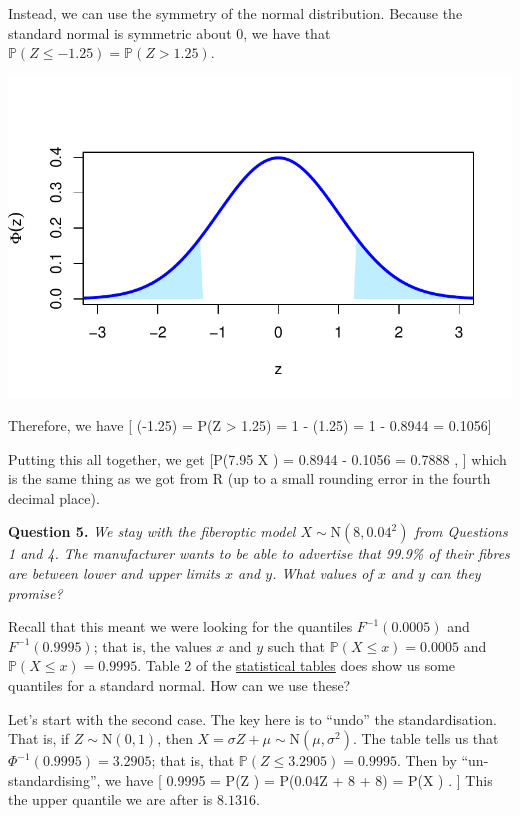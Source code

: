 \documentclass[
  letterpaper,
]{report}
\theoremstyle{definition}
\theoremstyle{definition}
\theoremstyle{remark}
\begin{document}
Instead, we can use the symmetry of the normal distribution. Because the
standard normal is symmetric about 0, we have that
\(\mathbb P(Z \leq -1.25) = \mathbb P(Z > 1.25)\).

\includegraphics{sections/L17-normal_files/figure-pdf/phiz-exm-1.pdf}

Therefore, we have {[} \Phi(-1.25) = \mathbb P(Z \textgreater{} 1.25) =
1 - \Phi(1.25) = 1 - 0.8944 = 0.1056{]}

Putting this all together, we get {[}\mathbb P(7.95 \leq X ) =
0.8944 - 0.1056 = 0.7888 , {]} which is the same thing as we got from R
(up to a small rounding error in the fourth decimal place).

\textbf{Question 5.} \emph{We stay with the fiberoptic model
\(X \sim \mathrm{N}(8, 0.04^2)\) from Questions 1 and 4. The
manufacturer wants to be able to advertise that 99.9\% of their fibres
are between lower and upper limits \(x\) and \(y\). What values of \(x\)
and \(y\) can they promise?}

Recall that this meant we were looking for the quantiles
\(F^{-1}(0.0005)\) and \(F^{-1}(0.9995)\); that is, the values \(x\) and
\(y\) such that \(\mathbb P(X \leq x) = 0.0005\) and
\(\mathbb P(X \leq x) = 0.9995\). Table 2 of the
\href{https://mpaldridge.github.io/math1710/stat-tab.pdf}{statistical
tables} does show us some quantiles for a standard normal. How can we
use these?

Let's start with the second case. The key here is to ``undo'' the
standardisation. That is, if \(Z \sim \mathrm{N}(0,1)\), then
\(X = \sigma Z + \mu \sim \mathrm{N}(\mu, \sigma^2)\). The table tells
us that \(\Phi^{-1}(0.9995) = 3.2905\); that is, that
\(\mathbb P(Z \leq 3.2905) = 0.9995\). Then by ``un-standardising'', we
have {[} 0.9995 = \mathbb P(Z ) = \mathbb P(0.04Z + 8
 + 8) = \mathbb P(X ) . {]} This the
upper quantile we are after is \(8.1316\).
\end{document}
